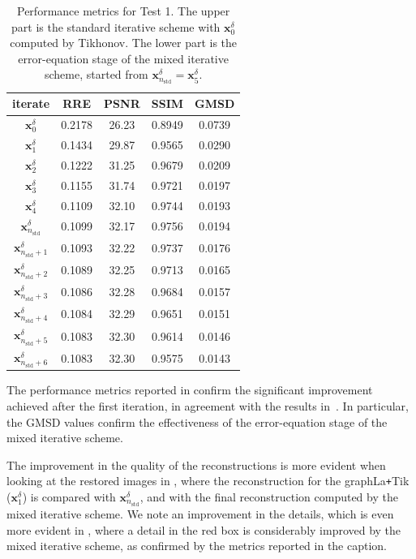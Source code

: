 \documentclass{article}
\theoremstyle{remark}
\newcommand{\bx}{{\bm{x}}}
\begin{document}
		\begin{table}
    \centering
        \begin{tabular}{c|c|c|c | c }
            iterate & RRE & PSNR & SSIM & GMSD \\ \hline
                $\bx_{0}^{\delta}$ & 0.2178  & 26.23 &  0.8949 & 0.0739\\
			$\bx_{1}^{\delta}$  & 0.1434 & 29.87 & 0.9565 & 0.0290 \\ 
			$\bx_{2}^{\delta}$  & 0.1222 & 31.25 & 0.9679 & 0.0209 \\ 
			$\bx_{3}^{\delta}$  & 0.1155 & 31.74 & 0.9721 & 0.0197 \\ 
			$\bx_{4}^{\delta}$  & 0.1109 & 32.10 & 0.9744 & 0.0193  \\ 
			$\bx_{n_{\mathrm{std}}}^{\delta}$  & 0.1099 & 32.17 & 0.9756 & 0.0194 \\ \hline
            $\bx_{n_{\mathrm{std}}+1}^{\delta}$  & 0.1093 & 32.22 & 0.9737 & 0.0176\\ 
			$\bx_{n_{\mathrm{std}}+2}^{\delta}$  & 0.1089 & 32.25 & 0.9713 & 0.0165\\ 
			$\bx_{n_{\mathrm{std}}+3}^{\delta}$  & 0.1086 & 32.28 & 0.9684 & 0.0157\\ 
			$\bx_{n_{\mathrm{std}}+4}^{\delta}$  & 0.1084 & 32.29 & 0.9651 & 0.0151\\ 
			$\bx_{n_{\mathrm{std}}+5}^{\delta}$  & 0.1083 & 32.30 & 0.9614 & 0.0146\\ 
			$\bx_{n_{\mathrm{std}}+6}^{\delta}$  & 0.1083 & 32.30 & 0.9575 & 0.0143\\ 
        \end{tabular}
		\caption{Performance metrics for Test 1. The upper part is the standard iterative scheme with $\bx_{0}^{\delta}$ computed by Tikhonov. The lower part is the error-equation stage of the mixed iterative scheme, started from $\bx_{n_{\mathrm{std}}}^{\delta}=\bx_{5}^{\delta}$.}
		\label{Table: test4}
	\end{table}
    
The performance metrics reported in  confirm the significant improvement achieved after the first iteration, in agreement with the results in~\cite{bianchi2025data}. 
In particular, the GMSD values confirm the effectiveness of the error-equation stage of the mixed iterative scheme.

The improvement in the quality of the reconstructions is more evident when looking at the restored images in , where the reconstruction for the graphLa\texttt{+}Tik ($\bx_{1}^{\delta}$) is compared with $\bx_{n_{\mathrm{std}}}^{\delta}$, and with the final reconstruction computed by the mixed iterative scheme. We note an improvement in the details, which is even more evident in , where a detail in the red box is considerably improved by the mixed iterative scheme, as confirmed by the metrics reported in the caption.
\end{document}
